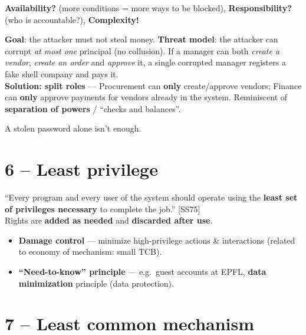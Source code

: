 \begin{warnbox}[title=Problems]
\textbf{Availability?} (more conditions = more ways to be blocked),
\textbf{Responsibility?} (who is accountable?), \textbf{Complexity!}
\end{warnbox}

\begin{exbox}[title=Payment system of a business]
\textbf{Goal}: the attacker must not steal money. \textbf{Threat model}: the attacker
can corrupt \emph{at most one} principal (no collusion). If a manager can both
\textit{create a vendor}, \textit{create an order} and \textit{approve} it, a single
corrupted manager registers a fake shell company and pays it. \\
\textbf{Solution: split roles} --- Procurement can \textbf{only} create/approve vendors;
Finance can \textbf{only} approve payments for vendors already in the system.
Reminiscent of \textbf{separation of powers} / ``checks and balances''.
\end{exbox}

\begin{exbox}[title=2AF]
A stolen password alone isn't enough.
\end{exbox}

\section{6 -- Least privilege}

\begin{defnbox}[title=Least privilege]
``Every program and every user of the system should operate using the \textbf{least set
of privileges necessary} to complete the job.'' [SS75] \\
Rights are \textbf{added as needed} and \textbf{discarded after use}.
\end{defnbox}

\begin{propbox}[title=Least privilege in practice]
\begin{itemize}
  \item \textbf{Damage control} --- minimize high-privilege actions \& interactions
        (related to economy of mechanism: small TCB).
  \item \textbf{``Need-to-know'' principle} --- e.g.\ guest accounts at EPFL,
        \textbf{data minimization} principle (data protection).
\end{itemize}
\end{propbox}

\section{7 -- Least common mechanism}


